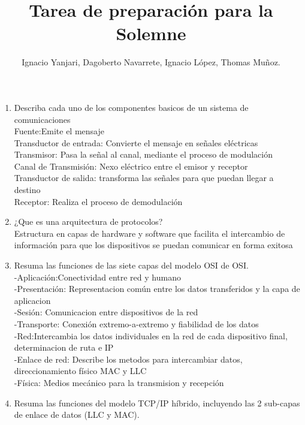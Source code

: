 \documentclass{udparticle}
\title{Tarea de preparación para la Solemne}
\author{Ignacio Yanjari, Dagoberto Navarrete, Ignacio López, Thomas Muñoz.}
\begin{document}
\maketitle
\begin{enumerate}

\item Describa cada uno de los componentes basicos de un sistema de comunicaciones \\
    Fuente:Emite el mensaje\\
    Transductor de entrada: Convierte el mensaje en señales eléctricas\\
    Transmisor: Pasa la señal al canal, mediante el proceso de modulación\\
    Canal de Transmisión: Nexo eléctrico entre el emisor y receptor\\
    Transductor de salida: transforma las señales para que puedan llegar a destino\\
    Receptor: Realiza el proceso de demodulación \\

\item ¿Que es una arquitectura de protocolos? \\
    Estructura en capas de hardware y software que facilita el intercambio de información para que los
    dispositivos se puedan comunicar en forma exitosa\\

\item Resuma las funciones de las siete capas del modelo OSI de OSI.\\
    -Aplicación:Conectividad entre red y humano\\
    -Presentación: Representacion común entre los datos transferidos y la capa de aplicacion\\
    -Sesión: Comunicacion entre dispositivos de la red\\
    -Transporte: Conexión extremo-a-extremo y fiabilidad de los datos\\
    -Red:Intercambia los datos individuales en la red de cada dispositivo final, determinacion de ruta e IP\\
    -Enlace de red: Describe los metodos para intercambiar datos, direccionamiento físico MAC y LLC\\
    -Física: Medios mecánico para la transmision y recepción\\
\item Resuma las funciones del modelo TCP/IP híbrido, incluyendo las 2 sub-capas de enlace de datos
(LLC y MAC).\\



\end{enumerate}
\end{document}
